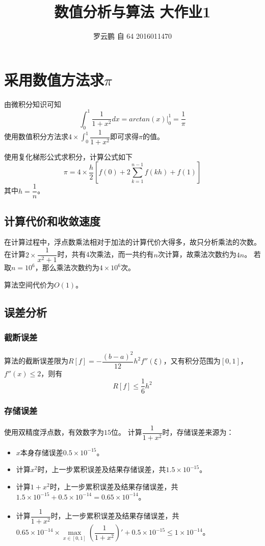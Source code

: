 \documentclass[11pt,a4paper]{ctexart}
\begin{document}
\title{数值分析与算法 \hspace{0.1in} 大作业1}
\author{罗云鹏 \hspace{0.1in} 自 64 \hspace{0.1in}2016011470}
\maketitle
\tableofcontents
\newpage

\section{采用数值方法求$\pi$}
由微积分知识可知
$$\int_0^1\dfrac{1}{1+x^2}dx = arctan(x)\bigg|_0^1 = \dfrac{1}{\pi}$$
使用数值积分方法求$4 \times \int_0^1\dfrac{1}{1+x^2}$即可求得$\pi$的值。

使用复化梯形公式求积分，计算公式如下
$$\pi = 4 \times \dfrac{h}{2}\left[f(0) + 2\sum\limits_{k=1}^{n-1}f(kh) + f(1)\right]$$
其中$h = \dfrac{1}{n}$。

\subsection{计算代价和收敛速度}
在计算过程中，浮点数乘法相对于加法的计算代价大得多，故只分析乘法的次数。
在计算$2 \times \dfrac{1}{x^2+1}$时，共有4次乘法，而一共约有$n$次计算，故乘法次数约为$4n$。
若取$n=10^6$，那么乘法次数约为$4\times 10^6$次。

算法空间代价为$O(1)$。

\subsection{误差分析}
\subsubsection{截断误差}
算法的截断误差限为$R[f] = - \dfrac{(b-a)^2}{12}h^2f''(\xi)$，又有积分范围为$[0, 1]$，$f''(x) \le 2$，则有
$$R[f] \le \dfrac{1}{6}h^2$$

\subsubsection{存储误差}
使用双精度浮点数，有效数字为$15$位。
计算$\dfrac{1}{1+x^2}$时，存储误差来源为：
\begin{itemize}
    \item $x$本身存储误差$0.5 \times 10^{-15}$。
    \item 计算$x^2$时，上一步累积误差及结果存储误差，共$1.5 \times 10^{-15}$。
    \item 计算$1 + x^2$时，上一步累积误差及结果存储误差，共$1.5 \times 10^{-15} + 0.5 \times 10^{-14} = 0.65 \times 10^{-14}$。
    \item 计算$\dfrac{1}{1 + x^2}$时，上一步累积误差及结果存储误差，共$0.65 \times 10^{-14} \times \max\limits_{x\in[0, 1]}\left(\dfrac{1}{1+x^2}\right)' + 0.5 \times 10^{-15} \le 1 \times 10^{-14}$。
\end{itemize}
\end{document}
